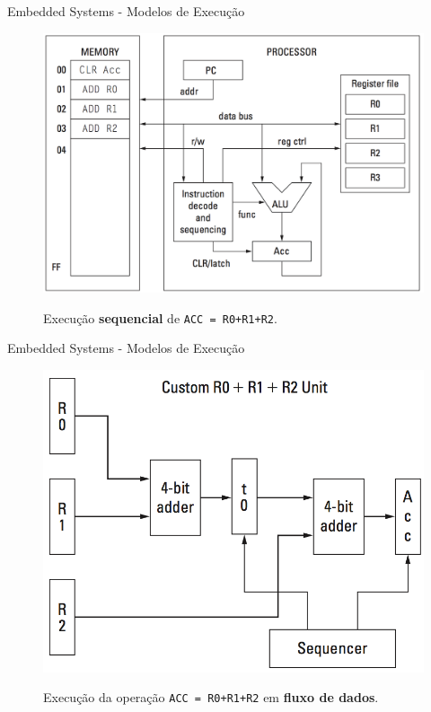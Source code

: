 \documentclass[aspectratio=169]{beamer}
\begin{document}
	\begin{frame}{Embedded Systems - Modelos de Execução}
		\begin{figure}[h]
			\centering
			\caption{Execução \textbf{sequencial} de \texttt{ACC = R0+R1+R2}.}
			\includegraphics[height=0.8\textheight]{img/print/circuito-fixo.png}
			\label{fig:circuito-fixo}
		\end{figure}
	\end{frame}
	
	\begin{frame}{Embedded Systems - Modelos de Execução}
		\begin{figure}[h]
			\centering
			\caption{Execução da operação \texttt{ACC = R0+R1+R2} em \textbf{fluxo de dados}.}
			\includegraphics[height=0.8\textheight]{img/print/fluxo-dados.png}
			\label{fig:fluxo-dados}
		\end{figure}
	\end{frame}
	
\end{document}
